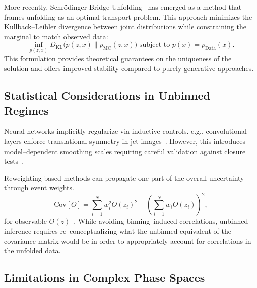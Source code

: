             More recently, Schrödinger Bridge Unfolding~\cite{Butter2025GenerativeMapping} has emerged as a method that frames unfolding as an optimal transport problem.
            This approach minimizes the Kullback--Leibler divergence between joint distributions while constraining the marginal to match observed data:
            \begin{equation}
                \inf_{p(z,x)} D_{\text{KL}}\Big(p(z,x) \parallel p_{\text{MC}}(z,x)\Big) \text{ subject to } p(x) = p_{\text{Data}}(x).
            \end{equation}
            This formulation provides theoretical guarantees on the uniqueness of the solution and offers improved stability compared to purely generative approaches.
        \subsection{Statistical Considerations in Unbinned Regimes}  
            Neural networks implicitly regularize via inductive controls. 
            e.g., convolutional layers enforce translational symmetry in jet images~\cite{Kheddar2025ImageSurvey}.
            However, this introduces model--dependent smoothing scales requiring careful validation against closure tests~\cite{Cowan2011AsymptoticPhysics}.

            Reweighting based methods can propagate one part of the overall uncertainty through event weights.
            \begin{equation}
                \text{Cov}[O] = \sum_{i=1}^N w_i^2 O(z_i)^2 - \left(\sum_{i=1}^N w_i O(z_i)\right)^2,
            \end{equation}
            for observable \(O(z)\)~\cite{LHCHiggsCrossSectionWorkingGroup2012HandbookDistributions}.
            While avoiding binning--induced correlations, unbinned inference requires re--conceptualizing what the unbinned equivalent of the covariance matrix would be in order to appropriately account for correlations in the unfolded data.
    \subsection{Limitations in Complex Phase Spaces}  
